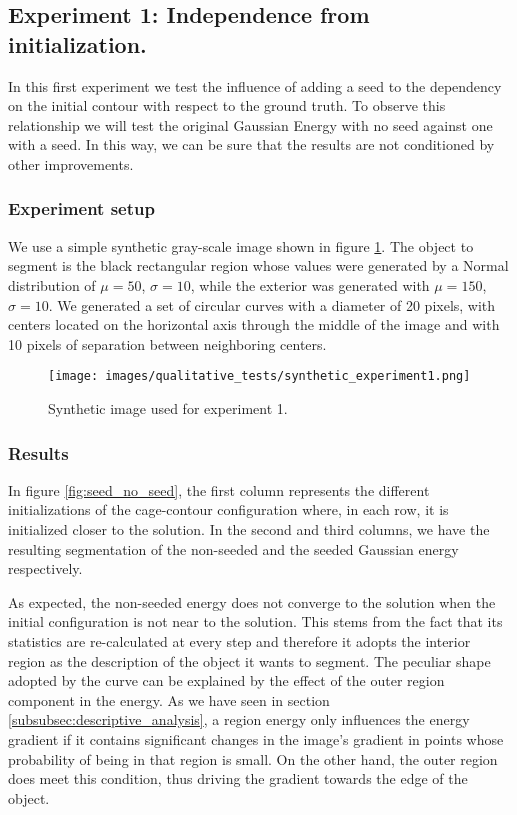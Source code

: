 \subsection{Experiment 1: Independence from initialization.}
\label{subsubsec:experiment1}

In this first experiment we test the influence of adding a seed to the dependency on the initial contour with respect to the ground truth. To observe this relationship we will test the original Gaussian Energy with no seed against one with a seed. In this way, we can be sure that the results are not conditioned by other improvements.

\subsubsection{Experiment setup}

We use a simple synthetic gray-scale image shown in figure \ref{fig:synthetic_experiment1}. The object to segment is the black rectangular region whose values were generated by a Normal distribution of $\mu=50$, $\sigma=10$, while the exterior was generated with $\mu=150$, $\sigma=10$. We generated a set of circular curves with a diameter of 20 pixels, with centers located on the horizontal axis through the middle of the image and with 10 pixels of separation between neighboring centers.

\begin{figure}[h]
	\centering
	{\texttt{[image: images/qualitative\_tests/synthetic\_experiment1.png]}}
	\caption{Synthetic image used for experiment 1.}
	\label{fig:synthetic_experiment1}
\end{figure}
\subsubsection{Results}

In figure \ref{fig:seed_no_seed}, the first column represents the different initializations of the cage-contour configuration where, in each row, it is initialized closer to the solution. In the second and third columns, we have the resulting segmentation of the non-seeded and the seeded Gaussian energy respectively. 

As expected, the non-seeded energy does not converge to the solution when the initial configuration is not near to the solution. This stems from the fact that its statistics are re-calculated at every step and therefore it adopts the interior region as the description of the object it wants to segment. The peculiar shape adopted by the curve can be explained by the effect of the outer region component in the energy. As we have seen in section \ref{subsubsec:descriptive_analysis}, a region energy only influences the energy gradient if it contains significant changes in the image's gradient in points whose probability of being in that region is small. On the other hand, the outer region does meet this condition, thus driving the gradient towards the edge of the object. 


